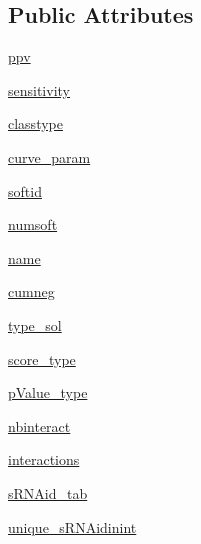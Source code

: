 \subsection*{\-Public \-Attributes}
\begin{DoxyCompactItemize}
\item 
\hyperlink{classirna_1_1iRNA__stat_1_1Computer_1_1Computer_a270c30e32be99028b0b933cc7f601a37}{ppv}
\item 
\hyperlink{classirna_1_1iRNA__stat_1_1Computer_1_1Computer_a72abc3e8536a95b5ab4a08e2cea05b92}{sensitivity}
\item 
\hyperlink{classirna_1_1iRNA__stat_1_1Computer_1_1Computer_abca09fb0c6bcfe5070d53b8e7f9b3921}{classtype}
\item 
\hyperlink{classirna_1_1iRNA__stat_1_1Computer_1_1Computer_ae12ec8a5342a67e83629fb1e9e8a4d6f}{curve\-\_\-param}
\item 
\hyperlink{classirna_1_1iRNA__stat_1_1Computer_1_1Computer_aec99168d433bbbc0fa3977bde5079160}{softid}
\item 
\hyperlink{classirna_1_1iRNA__stat_1_1Computer_1_1Computer_a4ec2a08417b8783bbeeb7bdfee66fd04}{numsoft}
\item 
\hyperlink{classirna_1_1iRNA__stat_1_1Computer_1_1Computer_afaca1453e59184a43488f1603fb2a87b}{name}
\item 
\hyperlink{classirna_1_1iRNA__stat_1_1Computer_1_1Computer_a9df2e0e5fc6e7ba414d370eea3c5aa80}{cumneg}
\item 
\hyperlink{classirna_1_1iRNA__stat_1_1Computer_1_1Computer_a334e80f1765d3401c6cf8ae70260e09b}{type\-\_\-sol}
\item 
\hyperlink{classirna_1_1iRNA__stat_1_1Computer_1_1Computer_a688a7149557a8cb39659c10f4e716c9a}{score\-\_\-type}
\item 
\hyperlink{classirna_1_1iRNA__stat_1_1Computer_1_1Computer_a51217fef5c53e827d5ed100cca59cc93}{p\-Value\-\_\-type}
\item 
\hyperlink{classirna_1_1iRNA__stat_1_1Computer_1_1Computer_ad417ba1712a6ed6723b1a7a7016c257a}{nbinteract}
\item 
\hyperlink{classirna_1_1iRNA__stat_1_1Computer_1_1Computer_a92900c8af56498ab9d819ad548f2164f}{interactions}
\item 
\hyperlink{classirna_1_1iRNA__stat_1_1Computer_1_1Computer_a513f09e859c15753e8d74105eca0ae53}{s\-R\-N\-Aid\-\_\-tab}
\item 
\hyperlink{classirna_1_1iRNA__stat_1_1Computer_1_1Computer_a77d6f5c98a4f4b8c9d1f1157551fd037}{unique\-\_\-s\-R\-N\-Aidinint}
\item 

\end{DoxyCompactItemize}
